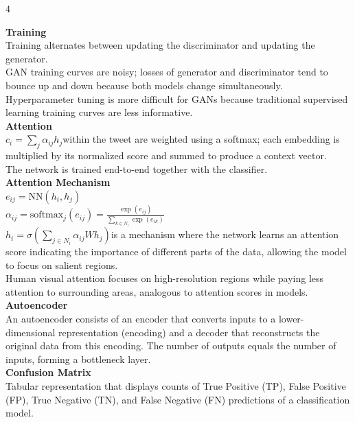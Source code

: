 \documentclass[8pt]{extarticle}
\begin{document}
\scriptsize
\begin{multicols}{4}

\vspace{2pt}\textbf{Training}\\
Training alternates between updating the discriminator and updating the generator.\\
GAN training curves are noisy; losses of generator and discriminator tend to bounce up and down because both models change simultaneously.\\
Hyperparameter tuning is more difficult for GANs because traditional supervised learning training curves are less informative.\\
\vspace{2pt}\textbf{Attention}\\
$c_i = \sum_{j} \alpha_{ij} h_j$\Words within the tweet are weighted using a softmax; each embedding is multiplied by its normalized score and summed to produce a context vector.\\
The network is trained end-to-end together with the classifier.\\
\vspace{2pt}\textbf{Attention Mechanism}\\
$e_{ij} = \text{NN}(h_i, h_j)$\\
$\alpha_{ij} = \text{softmax}_j(e_{ij}) = \frac{\exp(e_{ij})}{\sum_{k \in N_i} \exp(e_{ik})}$\\
$h_i = \sigma\left( \sum_{j \in N_i} \alpha_{ij} W h_j \right)$\Attention is a mechanism where the network learns an attention score indicating the importance of different parts of the data, allowing the model to focus on salient regions.\\
Human visual attention focuses on high-resolution regions while paying less attention to surrounding areas, analogous to attention scores in models.\\
\vspace{2pt}\textbf{Autoencoder}\\
An autoencoder consists of an encoder that converts inputs to a lower-dimensional representation (encoding) and a decoder that reconstructs the original data from this encoding. The number of outputs equals the number of inputs, forming a bottleneck layer.\\
\vspace{2pt}\textbf{Confusion Matrix}\\
Tabular representation that displays counts of True Positive (TP), False Positive (FP), True Negative (TN), and False Negative (FN) predictions of a classification model.\\

\end{multicols}
\end{document}
